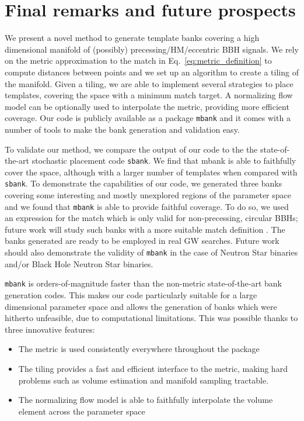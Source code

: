 \documentclass[twocolumn,showpacs,preprintnumbers,nofootinbib,prd,
superscriptaddress,10pt]{revtex4-2}
\begin{document}
\section{Final remarks and future prospects} \label{sec:conclusion}

We present a novel method to generate template banks covering a high dimensional manifold of (possibly) precessing/HM/eccentric BBH signals.
We rely on the metric approximation to the match in Eq.~\eqref{eq:metric_definition} to compute distances between points and we set up an algorithm to create a tiling of the manifold. Given a tiling, we are able to implement several strategies to place templates, covering the space with a minimum match target.
A normalizing flow model can be optionally used to interpolate the metric, providing more efficient coverage.
Our code is publicly available as a package \texttt{mbank} and it comes with a number of tools to make the bank generation and validation easy.

To validate our method, we compare the output of our code to the the state-of-the-art stochastic placement code \texttt{sbank}. We find that mbank is able to faithfully cover the space, although with a larger number of templates when compared with \texttt{sbank}.
To demonstrate the capabilities of our code, we generated three banks covering some interesting and mostly unexplored regions of the parameter space and we found that \texttt{mbank} is able to provide faithful coverage.
To do so, we used an expression for the match which is only valid for non-precessing, circular BBHs; future work will study such banks with a more suitable match definition \cite{Harry:2017weg}. The banks generated are ready to be employed in real GW searches.
Future work should also demonstrate the validity of \texttt{mbank} in the case of Neutron Star binaries and/or Black Hole Neutron Star binaries.

\texttt{mbank} is orders-of-magnitude faster than the non-metric state-of-the-art bank generation codes.
This makes our code particularly suitable for a large dimensional parameter space and allows the generation of banks which were hitherto unfeasible, due to computational limitations.
This was possible thanks to three innovative features:
\begin{itemize}
	\item The metric is used consistently everywhere throughout the package
	\item The tiling provides a fast and efficient interface to the metric, making hard problems such as volume estimation and manifold sampling tractable.
	\item The normalizing flow model is able to faithfully interpolate the volume element across the parameter space
\end{itemize}
\end{document}
